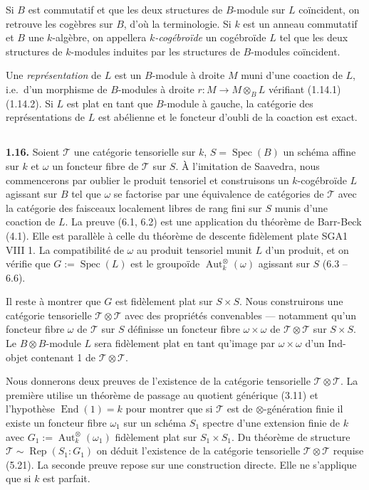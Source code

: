 \documentclass[12pt,a4paper]{article}
\theoremstyle{plain}
\theoremstyle{definition}
\theoremstyle{remark}
\DeclareMathOperator{\End}{End}
\DeclareMathOperator{\Aut}{Aut}
\DeclareMathOperator{\Spec}{Spec}
\DeclareMathOperator{\Rep}{Rep}
\begin{document}
Si $B$ est commutatif et que les deux structures de $B$-module sur $L$ coïncident, on retrouve les cogèbres sur $B$, d'où la terminologie. Si $k$ est un anneau commutatif et $B$ une $k$-algèbre, on appellera \emph{$k$-cogébroïde} un cogébroïde $L$ tel que les deux structures de $k$-modules induites par les structures de $B$-modules coïncident.

Une \emph{représentation} de $L$ est un $B$-module à droite $M$ muni d'une coaction de $L$, i.e.~d'un morphisme de $B$-modules à droite $r : M \to M \otimes_B L$ vérifiant (1.14.1) (1.14.2). Si $L$ est plat en tant que $B$-module à gauche, la catégorie des représentations de $L$ est abélienne et le foncteur d'oubli de la coaction est exact.

\subsection{}

\textbf{1.16.} Soient $\mathcal{T}$ une catégorie tensorielle sur $k$, $S = \Spec(B)$ un schéma affine sur $k$ et $\omega$ un foncteur fibre de $\mathcal{T}$ sur $S$. À l'imitation de Saavedra, nous commencerons par oublier le produit tensoriel et construisons un $k$-cogébroïde $L$ agissant sur $B$ tel que $\omega$ se factorise par une équivalence de catégories de $\mathcal{T}$ avec la catégorie des faisceaux localement libres de rang fini sur $S$ munis d'une coaction de $L$. La preuve (6.1, 6.2) est une application du théorème de Barr-Beck (4.1). Elle est parallèle à celle du théorème de descente fidèlement plate SGA1 VIII 1. La compatibilité de $\omega$ au produit tensoriel munit $L$ d'un produit, et on vérifie que $G := \Spec(L)$ est le groupoïde $\Aut^\otimes_k(\omega)$ agissant sur $S$ (6.3 -- 6.6).

Il reste à montrer que $G$ est fidèlement plat sur $S \times S$. Nous construirons une catégorie tensorielle $\mathcal{T} \otimes \mathcal{T}$ avec des propriétés convenables --- notamment qu'un foncteur fibre $\omega$ de $\mathcal{T}$ sur $S$ définisse un foncteur fibre $\omega \times \omega$ de $\mathcal{T} \otimes \mathcal{T}$ sur $S \times S$. Le $B \otimes B$-module $L$ sera fidèlement plat en tant qu'image par $\omega \times \omega$ d'un Ind-objet contenant 1 de $\mathcal{T} \otimes \mathcal{T}$.

Nous donnerons deux preuves de l'existence de la catégorie tensorielle $\mathcal{T} \otimes \mathcal{T}$. La première utilise un théorème de passage au quotient générique (3.11) et l'hypothèse $\End(1) = k$ pour montrer que si $\mathcal{T}$ est de $\otimes$-génération finie il existe un foncteur fibre $\omega_1$ sur un schéma $S_1$ spectre d'une extension finie de $k$ avec $G_1 := \Aut^\otimes_k(\omega_1)$ fidèlement plat sur $S_1 \times S_1$. Du théorème de structure $\mathcal{T} \sim \Rep(S_1:G_1)$ on déduit l'existence de la catégorie tensorielle $\mathcal{T} \otimes \mathcal{T}$ requise (5.21). La seconde preuve repose sur une construction directe. Elle ne s'applique que si $k$ est parfait.
\end{document}
